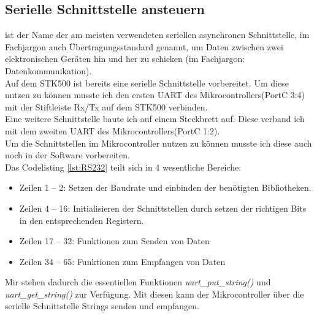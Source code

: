 \lstset{language=C, basicstyle=\footnotesize, showstringspaces=false, tabsize=8}


\subsection{Serielle Schnittstelle ansteuern}
\label{sec:RS232}	
 ist der Name der am meisten verwendeten seriellen asynchronen Schnittstelle, im Fachjargon auch Übertragungsstandard genannt, um Daten zwischen zwei elektronischen Geräten hin und her zu schicken (im Fachjargon: Datenkommunikation). \cite{uC:RS232}\\
Auf dem STK500 ist bereits eine serielle Schnittstelle vorbereitet. Um diese nutzen zu können musste ich den ersten UART des Mikrocontrollers(PortC 3:4) mit der Stiftleiste Rx/Tx auf dem STK500 verbinden.\\
Eine weitere Schnittstelle baute ich auf einem Steckbrett auf. Diese verband ich mit dem zweiten UART des Mikrocontrollers(PortC 1:2).\\
Um die Schnittstellen im Mikrocontroller nutzen zu können musste ich diese auch noch in der Software vorbereiten.\\
Das Codelisting \ref{lst:RS232} teilt sich in 4 wesentliche Bereiche: \\
\begin{itemize}
\item Zeilen 1 -- 2: Setzen der Baudrate und einbinden der benötigten Bibliotheken.
\item Zeilen 4 -- 16: Initialisieren der Schnittstellen durch setzen der richtigen Bits in den entsprechenden Registern.
\item Zeilen 17 -- 32: Funktionen zum Senden von Daten
\item Zeilen 34 -- 65: Funktionen zum Empfangen von Daten
\end{itemize}
\lstset{language=C, basicstyle=\footnotesize, showstringspaces=false, tabsize=8}

Mir stehen dadurch die essentiellen Funktionen \emph{uart\_put\_string()} und \emph{uart\_get\_string()} zur Verfügung. Mit diesen kann der Mikrocontroller über die serielle Schnittstelle Strings senden und empfangen.


